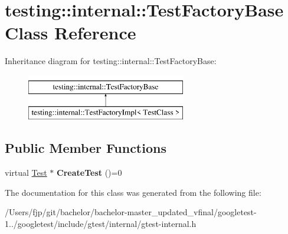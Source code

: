 \hypertarget{classtesting_1_1internal_1_1_test_factory_base}{}\section{testing\+:\+:internal\+:\+:Test\+Factory\+Base Class Reference}
\label{classtesting_1_1internal_1_1_test_factory_base}
Inheritance diagram for testing\+:\+:internal\+:\+:Test\+Factory\+Base\+:\begin{figure}[H]
\begin{center}
\leavevmode
\includegraphics[height=2.000000cm]{classtesting_1_1internal_1_1_test_factory_base}
\end{center}
\end{figure}
\subsection*{Public Member Functions}
\begin{DoxyCompactItemize}
\item 
\mbox{\label{classtesting_1_1internal_1_1_test_factory_base_a07ac3ca0b196cdb092da0bb186b7c030}} 
virtual \mbox{\hyperlink{classtesting_1_1_test}{Test}} $\ast$ {\bfseries Create\+Test} ()=0
\end{DoxyCompactItemize}


The documentation for this class was generated from the following file\+:\begin{DoxyCompactItemize}
\item 
/\+Users/fjp/git/bachelor/bachelor-\/master\+\_\+updated\+\_\+vfinal/googletest-\/1../googletest/include/gtest/internal/gtest-\/internal.\+h\end{DoxyCompactItemize}

